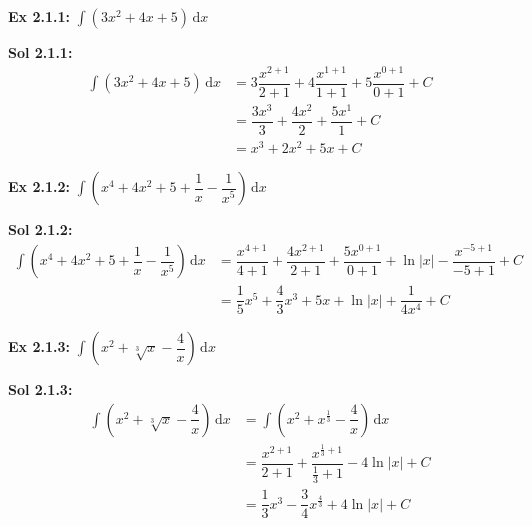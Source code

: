 \begin{tcolorbox}[example]
    \textbf{Ex 2.1.1: } $\int \left(3x^2 + 4x + 5\right) \,\mathrm{d}x$
\end{tcolorbox}
\begin{tcolorbox}[solution]
    \textbf{Sol 2.1.1: } \begin{align*}
        \int \left(3x^2 + 4x + 5\right) \,\mathrm{d}x &= 3\dfrac{x^{2 + 1}}{2 + 1} + 4\dfrac{x^{1 + 1}}{1 + 1} + 5\dfrac{x^{0 + 1}}{0 + 1} + C \\[11pt]
        & = \dfrac{3x^3}{3} + \dfrac{4x^2}{2} + \dfrac{5x^1}{1} + C \\[11pt]
        & = \boxed{x^3 + 2x^2 + 5x + C}
    \end{align*}
\end{tcolorbox} \vspace{11pt}

\begin{tcolorbox}[example]
    \textbf{Ex 2.1.2: } $\int \left(x^4 + 4x^2 + 5 + \dfrac{1}{x} - \dfrac{1}{x^5}\right) \,\mathrm{d}x$
\end{tcolorbox}
\begin{tcolorbox}[solution]
    \textbf{Sol 2.1.2: } \begin{align*}
        \int \left(x^4 + 4x^2 + 5 + \dfrac{1}{x} - \dfrac{1}{x^5}\right) \,\mathrm{d}x &= \dfrac{x^{4 + 1}}{4 + 1} + \dfrac{4x^{2 + 1}}{2 + 1} + \dfrac{5x^{0 + 1}}{0 + 1} + \ln |x| - \dfrac{x^{-5 + 1}}{-5 + 1} + C \\[11pt]
        & = \boxed{\dfrac{1}{5}x^5 + \dfrac{4}{3}x^3 + 5x + \ln |x| + \dfrac{1}{4x^4} + C}
    \end{align*}
\end{tcolorbox} \vspace{11pt}

\begin{tcolorbox}[example]
    \textbf{Ex 2.1.3: } $\int \left(x^2 + \sqrt[3]{x} - \dfrac{4}{x}\right) \,\mathrm{d}x$
\end{tcolorbox}
\begin{tcolorbox}[solution]
    \textbf{Sol 2.1.3: } \begin{align*}
        \int \left(x^2 + \sqrt[3]x - \dfrac{4}{x}\right) \,\mathrm{d}x &= \int \left(x^2 + x^{\frac{1}{3}} - \dfrac{4}{x}\right) \,\mathrm{d}x \\[11pt]
        & = \dfrac{x^{2 + 1}}{2 + 1} + \dfrac{x^{\frac{1}{3} + 1}}{\frac{1}{3} + 1 } - 4\ln |x| + C \\[11pt]
        & = \boxed{\dfrac{1}{3}x^3 - \dfrac{3}{4}x^{\frac{4}{3}} + 4\ln |x| + C}
    \end{align*}
\end{tcolorbox} 

